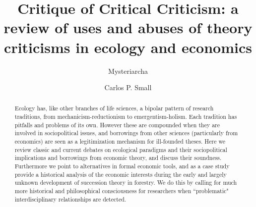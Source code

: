 \documentclass[a4paper, 9pt]{article}
\title{Critique of Critical Criticism: a review of uses and abuses of theory criticisms in ecology and economics}
\author[1]{Mysteriarcha}
\author[1]{Carlos P. Small}
\affil[1]{Vienna Circle Club}
\begin{document}
		
	\maketitle
	
	\begin{abstract}
		Ecology has, like other branches of life sciences, a bipolar 
		pattern of research traditions, from mechanicism-reductionism
		to emergentism-holism. Each tradition has pitfalls and 
		problems of its own. However these are compounded when they 
		are involved in sociopolitical issues, and borrowings from 
		other sciences (particularly from economics) are seen as a 
		legitimization mechanism for ill-founded theses. Here we 
		review classic and current debates on ecological paradigms 
		and their sociopolitical implications and borrowings from 
		economic theory, and discuss their soundness. Furthermore we 
		point to alternatives in formal economic tools, and as a 
		case study provide a historical analysis of the economic 
		interests during the early and largely unknown development 
		of succession theory in forestry. We do this by calling for 
		much more historical and philosophical consciousness for 
		researchers when ``problematic" interdisciplinary 
		relationships are detected.
	\end{abstract}
	
	
	
\end{document}
